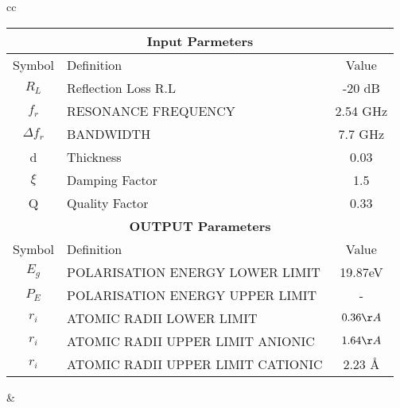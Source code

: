 \documentclass[journal]{IEEEtran}
\begin{document}
\begin{tabular}{cc}
		\begin{tabular}{|c|p{3cm}|c|}
			\multicolumn{3}{c|}{\textbf{Input Parmeters }} \\
			\hline
					Symbol&  Definition & Value \\
				\hline
				$R_L$ &	Reflection Loss R.L &-20 dB \\
				\hline
					$f_r$ & 	RESONANCE FREQUENCY & 2.54 GHz \\
					\hline
						$\Delta f_r $ & 	BANDWIDTH           &7.7 GHz \\
						\hline
						d & Thickness  &	0.03\\
						\hline
								$\xi$	 &  Damping Factor & 1.5 \\
								\hline
									Q & Quality Factor & 0.33 \\
									\hline
								
									
										\multicolumn{3}{c|}{\textbf{OUTPUT Parameters }} \\
									\hline
									Symbol& Definition & Value \\
									\hline	
								 $E_g$  &POLARISATION ENERGY LOWER LIMIT  & 19.87eV      \\
									\hline
									 $P_E$ & POLARISATION ENERGY UPPER LIMIT   & - \\
									\hline 
									 $r_i$ & ATOMIC RADII LOWER LIMIT  & $0.36 \AA$             \\
									\hline 
									  $r_i$&    ATOMIC RADII UPPER LIMIT ANIONIC & $1.64 \AA$                    \\
									\hline 
									 $r_i$&    ATOMIC RADII UPPER LIMIT CATIONIC        & 2.23 \AA   \\
									\hline 
		\end{tabular}
&
	

\end{tabular}
\end{document}
